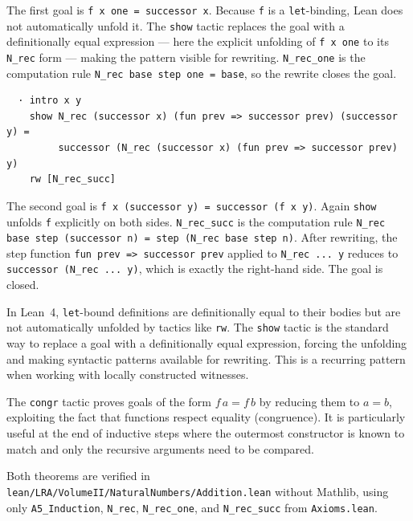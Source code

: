 \noindent
The first goal is \verb|f x one = successor x|. Because \verb|f| is a
\verb|let|-binding, Lean does not automatically unfold it. The
\verb|show| tactic replaces the goal with a definitionally equal
expression --- here the explicit unfolding of \verb|f x one| to its
\verb|N_rec| form --- making the pattern visible for rewriting.
\verb|N_rec_one| is the computation rule
\verb|N_rec base step one = base|, so the rewrite closes the goal.

\begin{verbatim}
  · intro x y
    show N_rec (successor x) (fun prev => successor prev) (successor y) =
         successor (N_rec (successor x) (fun prev => successor prev) y)
    rw [N_rec_succ]
\end{verbatim}

\noindent
The second goal is \verb|f x (successor y) = successor (f x y)|.
Again \verb|show| unfolds \verb|f| explicitly on both sides.
\verb|N_rec_succ| is the computation rule
\verb|N_rec base step (successor n) = step (N_rec base step n)|.
After rewriting, the step function \verb|fun prev => successor prev|
applied to \verb|N_rec ... y| reduces to
\verb|successor (N_rec ... y)|, which is exactly the right-hand side.
The goal is closed.

\begin{remark*}
In Lean~4, \verb|let|-bound definitions are definitionally equal to
their bodies but are not automatically unfolded by tactics like
\verb|rw|. The \verb|show| tactic is the standard way to replace a goal
with a definitionally equal expression, forcing the unfolding and making
syntactic patterns available for rewriting. This is a recurring pattern
when working with locally constructed witnesses.
\end{remark*}

\begin{remark*}
The \verb|congr| tactic proves goals of the form $f\,a = f\,b$ by
reducing them to $a = b$, exploiting the fact that functions respect
equality (congruence). It is particularly useful at the end of inductive
steps where the outermost constructor is known to match and only the
recursive arguments need to be compared.
\end{remark*}

\begin{remark*}
Both theorems are verified in
\texttt{lean/LRA/VolumeII/NaturalNumbers/Addition.lean}
without Mathlib, using only \texttt{A5\_Induction}, \texttt{N\_rec},
\texttt{N\_rec\_one}, and \texttt{N\_rec\_succ} from \texttt{Axioms.lean}.
\end{remark*}